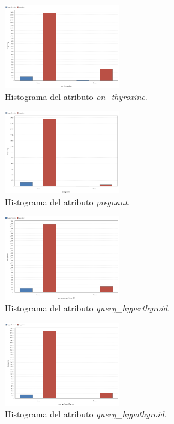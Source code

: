 \documentclass[osajnl,twocolumn,showpacs,superscriptaddress,10pt,floatfix]{revtex4-1} %
\begin{document}
\begin{figure}[H]
    \centering
    \includegraphics[width=0.45\textwidth]{analysis/histogram_on_thyroxine}
    \caption{Histograma del atributo \textit{on\_thyroxine}.}
    \label{figure:on_thyroxine}
\end{figure}

\begin{figure}[H]
    \centering
    \includegraphics[width=0.45\textwidth]{analysis/histogram_pregnant}
    \caption{Histograma del atributo \textit{pregnant}.}
    \label{figure:pregnant}
\end{figure}

\begin{figure}[H]
    \centering
    \includegraphics[width=0.45\textwidth]{analysis/histogram_query_hyperthyroid}
    \caption{Histograma del atributo \textit{query\_hyperthyroid}.}
    \label{figure:query_hyperthyroid}
\end{figure}

\begin{figure}[H]
    \centering
    \includegraphics[width=0.45\textwidth]{analysis/histogram_query_hypothyroid}
    \caption{Histograma del atributo \textit{query\_hypothyroid}.}
    \label{figure:query_hypothyroid}
\end{figure}
\end{document}
